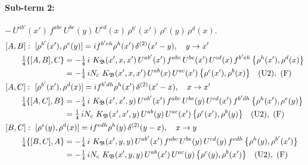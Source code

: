 \documentclass[10pt]{article}
\numberwithin{equation}{section}
\begin{document}
\paragraph{Sub-term 2:} $-\,U^{ab'}(x')\,f^{abc}\,U^{be}(y)\,U^{cd}(x)\,\rho^{b'}(x')\,\rho^{e}(y)\,\rho^{d}(x)$.
\begin{align}
&[A,B]:\ [\rho^{b'}(x'),\rho^{e}(y)]=i f^{b'eh}\rho^{h}(x')\,\delta^{(2)}(x'-y),\quad y\to x'\notag\\
&\qquad \tfrac14\{[A,B],C\}=-\tfrac14\,i\,\,K_{\mathfrak B}(x',x,x')\,U^{ab'}(x')\,f^{abc}\,U^{be}(x')\,U^{cd}(x)\,f^{b'eh}\,\big\{\rho^{h}(x'),\rho^{d}(x)\big\}\notag\\
&\qquad\phantom{\tfrac14\{[A,B],C\}}=-\tfrac14\,i N_{c}\,\,K_{\mathfrak B}(x',x,x')\,U^{ab}(x)\,U^{ac}(x')\,\big\{\rho^{c}(x'),\rho^{b}(x)\big\}\quad\text{(U2)},\ \text{(F)}
\label{R:eq:GI.IV-2-AB}\\
&[A,C]:\ [\rho^{b'}(x'),\rho^{d}(x)]=i f^{b'dh}\rho^{h}(x')\,\delta^{(2)}(x'-x),\quad x\to x'\notag\\
&\qquad \tfrac14\{[A,C],B\}=-\tfrac14\,i\,\,K_{\mathfrak B}(x',x',y)\,U^{ab'}(x')\,f^{abc}\,U^{be}(y)\,U^{cd}(x')\,f^{b'dh}\,\big\{\rho^{h}(x'),\rho^{e}(y)\big\}\notag\\
&\qquad\phantom{\tfrac14\{[A,C],B\}}=\tfrac14\,i N_{c}\,\,K_{\mathfrak B}(x',x',y)\,U^{ab}(y)\,U^{ac}(x')\,\big\{\rho^{c}(x'),\rho^{b}(y)\big\}\quad\text{(U2)},\ \text{(F)}
\label{R:eq:GI.IV-2-AC}\\
&[B,C]:\ [\rho^{e}(y),\rho^{d}(x)]=i f^{edh}\rho^{h}(y)\,\delta^{(2)}(y-x),\quad x\to y\notag\\
&\qquad \tfrac14\{[B,C],A\}=-\tfrac14\,i\,\,K_{\mathfrak B}(x',y,y)\,U^{ab'}(x')\,f^{abc}\,U^{be}(y)\,U^{cd}(y)\,f^{edh}\,\big\{\rho^{h}(y),\rho^{b'}(x')\big\}\notag\\
&\qquad\phantom{\tfrac14\{[B,C],A\}}=-\tfrac14\,i N_{c}\,\,K_{\mathfrak B}(x',y,y)\,U^{ab}(x')\,U^{ac}(y)\,\big\{\rho^{c}(y),\rho^{b}(x')\big\}\quad\text{(U2)},\ \text{(F)}
\label{R:eq:GI.IV-2-BC}
\end{align}
\end{document}
